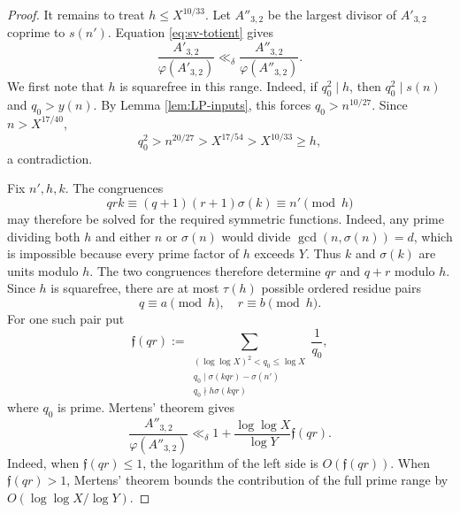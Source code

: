 \documentclass[11pt,letterpaper,reqno]{amsart}
\numberwithin{equation}{section}
\theoremstyle{remark}
\renewcommand{\leq}{\leqslant}
\renewcommand{\geq}{\geqslant}
\begin{document}
\begin{proof}
It remains to treat $h\leq X^{10/33}$. Let $A''_{3,2}$ be the largest
divisor of $A'_{3,2}$ coprime to $s(n')$. Equation
\eqref{eq:sv-totient} gives
\[
 \frac{A'_{3,2}}{\varphi(A'_{3,2})}
 \ll_\delta\frac{A''_{3,2}}{\varphi(A''_{3,2})}.
\]
We first note that $h$ is squarefree in this range. Indeed, if
$q_0^2\mid h$, then $q_0^2\mid s(n)$ and $q_0>y(n)$. By
Lemma \ref{lem:LP-inputs}, this forces $q_0>n^{10/27}$. Since
$n>X^{17/40}$,
\[
 q_0^2>n^{20/27}>X^{17/54}>X^{10/33}\geq h,
\]
a contradiction.

Fix $n',h,k$. The congruences
\[
 qrk\equiv(q+1)(r+1)\sigma(k)\equiv n'\pmod h
\]
may therefore be solved for the required symmetric functions. Indeed, any prime
dividing both $h$ and either $n$ or $\sigma(n)$ would divide
$\gcd(n,\sigma(n))=d$, which is impossible because every prime factor of
$h$ exceeds $Y$. Thus $k$ and $\sigma(k)$ are units modulo $h$. The two
congruences therefore
determine $qr$ and $q+r$ modulo $h$. Since $h$ is squarefree, there are at
most $\tau(h)$ possible ordered residue pairs
\[
 q\equiv a\pmod h,\quad r\equiv b\pmod h.
\]
For one such pair put
\[
 \mathfrak{f}(qr):=
 \sum_{\substack{(\log\log X)^2<q_0\leq\log X\\
 q_0\mid\sigma(kqr)-\sigma(n')\\
 q_0\nmid h\sigma(kqr)}}\frac1{q_0},
\]
where $q_0$ is prime. Mertens' theorem gives
\begin{equation}\label{eq:sv-intermediate-totient}
 \frac{A''_{3,2}}{\varphi(A''_{3,2})}
 \ll_\delta 1+\frac{\log\log X}{\log Y}\mathfrak{f}(qr).
\end{equation}
Indeed, when $\mathfrak{f}(qr)\leq1$, the logarithm of the left side is
$O(\mathfrak{f}(qr))$. When $\mathfrak{f}(qr)>1$, Mertens' theorem bounds
the contribution of the full prime range by
$O(\log\log X/\log Y)$.


\end{proof}
\end{document}
